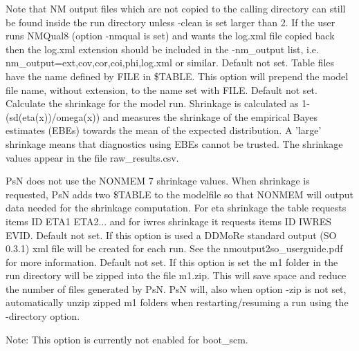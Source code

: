 \begin{optionlist}
Note that NM output files which are not copied to the calling directory can still be found inside the run directory unless -clean is set larger than 2. If the user runs NMQual8 (option -nmqual is set) and wants the log.xml file copied back then the log.xml extension should be included in the -nm\_output list, i.e. nm\_output=ext,cov,cor,coi,phi,log.xml or similar.
\nextopt
{}
Default not set. Table files have the name defined by FILE in \$TABLE. This option will prepend the model file name, without extension, to the name set with FILE.
\nextopt
{}
Default not set. Calculate the shrinkage for the model run.  Shrinkage is calculated as 1-(sd(eta(x))/omega(x)) and measures the shrinkage of the empirical Bayes estimates (EBEs) towards the mean of the expected distribution.  A 'large' shrinkage means that diagnostics using EBEs cannot be trusted. The shrinkage values appear in the file raw\_results.csv. 

PsN does not use the NONMEM 7 shrinkage values. When shrinkage is requested, PsN adds two \$TABLE to the modelfile so that NONMEM will output data needed for the shrinkage computation. For eta shrinkage the table requests items ID ETA1 ETA2... and for iwres shrinkage it requests items ID IWRES EVID. 
\nextopt
{}
Default not set. If this option is used a DDMoRe standard output (SO 0.3.1) xml file will be created for each run. See the \mbox{nmoutput2so\_userguide.pdf} for more information.
\nextopt
{}
Default not set. If this option is set the m1 folder in the run directory will be zipped into the file m1.zip. This will save space and reduce the number of files generated by PsN. PsN will, also when option -zip is not set, automatically unzip zipped m1 folders when restarting/resuming a run using the -directory option.

Note: This option is currently not enabled for boot\_scm.
\nextopt
\end{optionlist}
